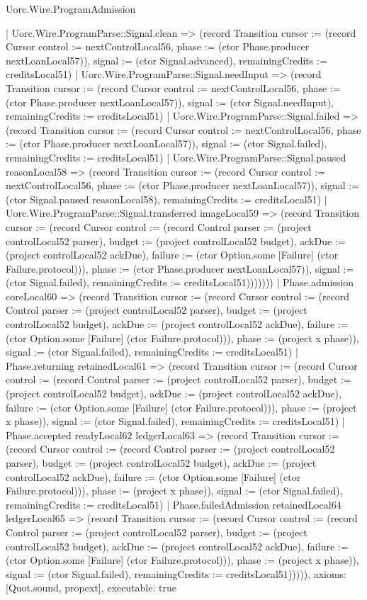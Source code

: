 \begin{lexlean}{Uorc.Wire.ProgramAdmission}
\begin{semanticmodule}
{        | Uorc.Wire.ProgramParse::Signal.clean => (record Transition {cursor := (record Cursor {control := nextControlLocal56, phase := (ctor Phase.producer nextLoanLocal57)}), signal := (ctor Signal.advanced), remainingCredits := creditsLocal51})
        | Uorc.Wire.ProgramParse::Signal.needInput => (record Transition {cursor := (record Cursor {control := nextControlLocal56, phase := (ctor Phase.producer nextLoanLocal57)}), signal := (ctor Signal.needInput), remainingCredits := creditsLocal51})
        | Uorc.Wire.ProgramParse::Signal.failed => (record Transition {cursor := (record Cursor {control := nextControlLocal56, phase := (ctor Phase.producer nextLoanLocal57)}), signal := (ctor Signal.failed), remainingCredits := creditsLocal51})
        | Uorc.Wire.ProgramParse::Signal.paused reasonLocal58 => (record Transition {cursor := (record Cursor {control := nextControlLocal56, phase := (ctor Phase.producer nextLoanLocal57)}), signal := (ctor Signal.paused reasonLocal58), remainingCredits := creditsLocal51})
        | Uorc.Wire.ProgramParse::Signal.transferred imageLocal59 => (record Transition {cursor := (record Cursor {control := (record Control {parser := (project controlLocal52 parser), budget := (project controlLocal52 budget), ackDue := (project controlLocal52 ackDue), failure := (ctor Option.some [Failure] (ctor Failure.protocol))}), phase := (ctor Phase.producer nextLoanLocal57)}), signal := (ctor Signal.failed), remainingCredits := creditsLocal51})))))))
      | Phase.admission coreLocal60 => (record Transition {cursor := (record Cursor {control := (record Control {parser := (project controlLocal52 parser), budget := (project controlLocal52 budget), ackDue := (project controlLocal52 ackDue), failure := (ctor Option.some [Failure] (ctor Failure.protocol))}), phase := (project x phase)}), signal := (ctor Signal.failed), remainingCredits := creditsLocal51})
      | Phase.returning retainedLocal61 => (record Transition {cursor := (record Cursor {control := (record Control {parser := (project controlLocal52 parser), budget := (project controlLocal52 budget), ackDue := (project controlLocal52 ackDue), failure := (ctor Option.some [Failure] (ctor Failure.protocol))}), phase := (project x phase)}), signal := (ctor Signal.failed), remainingCredits := creditsLocal51})
      | Phase.accepted readyLocal62 ledgerLocal63 => (record Transition {cursor := (record Cursor {control := (record Control {parser := (project controlLocal52 parser), budget := (project controlLocal52 budget), ackDue := (project controlLocal52 ackDue), failure := (ctor Option.some [Failure] (ctor Failure.protocol))}), phase := (project x phase)}), signal := (ctor Signal.failed), remainingCredits := creditsLocal51})
      | Phase.failedAdmission retainedLocal64 ledgerLocal65 => (record Transition {cursor := (record Cursor {control := (record Control {parser := (project controlLocal52 parser), budget := (project controlLocal52 budget), ackDue := (project controlLocal52 ackDue), failure := (ctor Option.some [Failure] (ctor Failure.protocol))}), phase := (project x phase)}), signal := (ctor Signal.failed), remainingCredits := creditsLocal51}))))),
  axioms: [Quot.sound, propext],
  executable: true
}


\end{semanticmodule}
\end{lexlean}
